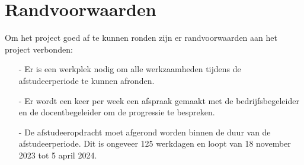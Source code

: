 \section{Randvoorwaarden}
Om het project goed af te kunnen ronden zijn er randvoorwaarden aan het project verbonden:
\begin{itemize}
	\item[-] Er is een werkplek nodig om alle werkzaamheden tijdens de afstudeerperiode te kunnen afronden.
	\item[-] Er wordt een keer per week een afspraak gemaakt met de bedrijfsbegeleider en de docentbegeleider om de progressie te bespreken.
	\item[-] De afstudeeropdracht moet afgerond worden binnen de duur van de afstudeerperiode.
	      Dit is ongeveer 125 werkdagen en loopt van 18 november 2023 tot 5 april 2024.
\end{itemize}
